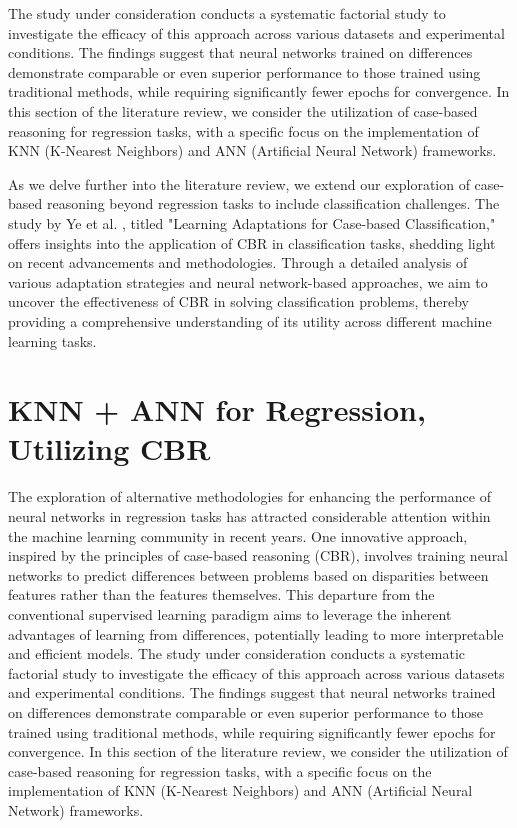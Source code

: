 \documentclass[a4paper, 12pt]{report}
\begin{document}
The study under consideration \cite{learningFromDifferences2022} 
conducts a systematic factorial study to investigate the efficacy of this approach across various datasets and experimental conditions. 
The findings suggest that neural networks trained on differences demonstrate comparable or even superior performance to those trained 
using traditional methods, while requiring significantly fewer epochs for convergence. In this section of the literature review, 
we consider the utilization of case-based reasoning for regression tasks, with a specific focus on the implementation of KNN (K-Nearest Neighbors) 
and ANN (Artificial Neural Network) frameworks.

As we delve further into the literature review, we extend our exploration of case-based reasoning beyond regression tasks to include classification challenges. 
The study by Ye et al. \cite{ye2021learning}, titled "Learning Adaptations for Case-based Classification," 
offers insights into the application of CBR in classification tasks, shedding light on recent advancements and methodologies. 
Through a detailed analysis of various adaptation strategies and neural network-based approaches, we aim to uncover the effectiveness 
of CBR in solving classification problems, thereby providing a comprehensive understanding of its utility across different machine learning tasks.


\section{KNN + ANN for Regression, Utilizing CBR}

The exploration of alternative methodologies for enhancing the performance of neural networks in regression tasks has attracted considerable attention within the machine learning community in recent years.
One innovative approach, inspired by the principles of case-based reasoning (CBR),
involves training neural networks to predict differences between problems based on disparities between features rather than the features themselves.
This departure from the conventional supervised learning paradigm aims to leverage the inherent advantages of learning from differences, potentially leading to more interpretable and efficient models.
The study under consideration \cite{learningFromDifferences2022} conducts a systematic factorial study to investigate the efficacy of this approach across various datasets and experimental conditions.
The findings suggest that neural networks trained on differences demonstrate comparable or even superior performance to those trained using traditional methods,
while requiring significantly fewer epochs for convergence. In this section of the literature review, we consider the utilization of case-based reasoning for regression tasks,
with a specific focus on the implementation of KNN (K-Nearest Neighbors) and ANN (Artificial Neural Network) frameworks.
\end{document}

